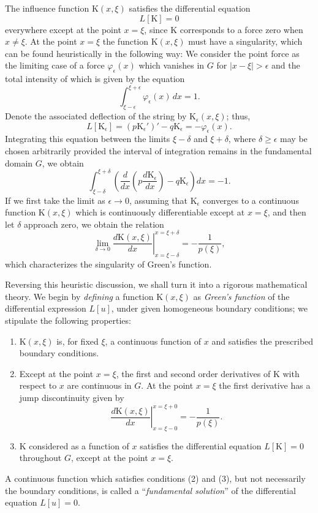 The influence function $\mathrm K(x,\xi)$ satisfies the differential equation
\[
L[\mathrm K]=0
\]
everywhere except at the point $x=\xi$, since $\mathrm K$ corresponds to a force zero when $x\ne\xi$. At the point $x=\xi$ the function $\mathrm K(x,\xi)$ must have a singularity, which can be found heuristically in the following way: We consider the point force as the limiting case of a force $\varphi_\epsilon(x)$ which vanishes in $G$ for $|x-\xi|>\epsilon$ and the total intensity of which is given by the equation
\[
\int_{\xi-\epsilon}^{\xi+\epsilon}\varphi_\epsilon(x)\,dx=1.
\]
Denote the associated deflection of the string by $\mathrm K_\epsilon(x,\xi)$; thus,
\[
L[\mathrm K_\epsilon]=(p\mathrm K_\epsilon')'-q\mathrm K_\epsilon=-\varphi_\epsilon(x).
\]
Integrating this equation between the limits $\xi-\delta$ and $\xi+\delta$, where $\delta\ge\epsilon$ may be chosen arbitrarily provided the interval of integration remains in the fundamental domain $G$, we obtain
\[
\int_{\xi-\delta}^{\xi+\delta}
\left(\frac{d}{dx}\left(p\frac{d\mathrm K_\epsilon}{dx}\right)-q\mathrm K_\epsilon\right)dx=-1.
\]
If we first take the limit as $\epsilon\to0$, assuming that $\mathrm K_\epsilon$ converges to a continuous function $\mathrm K(x,\xi)$ which is continuously differentiable except at $x=\xi$, and then let $\delta$ approach zero, we obtain the relation
\[
\lim_{\delta\to0}\left.\frac{d\mathrm K(x,\xi)}{dx}\right|_{x=\xi-\delta}^{x=\xi+\delta}
=-\frac1{p(\xi)},
\]
which characterizes the singularity of Green's function.

Reversing this heuristic discussion, we shall turn it into a rigorous mathematical theory. We begin by \emph{defining} a function $\mathrm K(x,\xi)$ as \emph{Green's function} of the differential expression $L[u]$, under given homogeneous boundary conditions; we stipulate the following properties:
\begin{enumerate}[label=(\arabic*)]
\item $\mathrm K(x,\xi)$ is, for fixed $\xi$, a continuous function of $x$ and satisfies the prescribed boundary conditions.
\item Except at the point $x=\xi$, the first and second order derivatives of $\mathrm K$ with respect to $x$ are continuous in $G$. At the point $x=\xi$ the first derivative has a jump discontinuity given by
\begin{equation}
\left.\frac{d\mathrm K(x,\xi)}{dx}\right|_{x=\xi-0}^{x=\xi+0}=-\frac1{p(\xi)}.
\tag{95}
\end{equation}
\item $\mathrm K$ considered as a function of $x$ satisfies the differential equation $L[\mathrm K]=0$ throughout $G$, except at the point $x=\xi$.
\end{enumerate}
A continuous function which satisfies conditions (2) and (3), but not necessarily the boundary conditions, is called a ``\emph{fundamental solution}'' of the differential equation $L[u]=0$.

